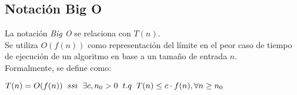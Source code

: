 \subsection{Notación Big O}
La notación \textit{Big O} se relaciona con $T(n)$. \\

Se utiliza $O(f(n))$ como representación del límite en el peor caso de
tiempo de ejecución de un algoritmo en base a un tamaño de entrada $n$.\\

Formalmente, se define como:

\begin{center}
  \(T(n) = O(f(n))\hspace{0.2cm}ssi\hspace{0.2cm}\exists c, n_{0} > 0\hspace{0.2cm}t.q\hspace{0.2cm}T(n) \leq c\cdot f(n), \forall{n} \geq n_{0}\)
\end{center}
